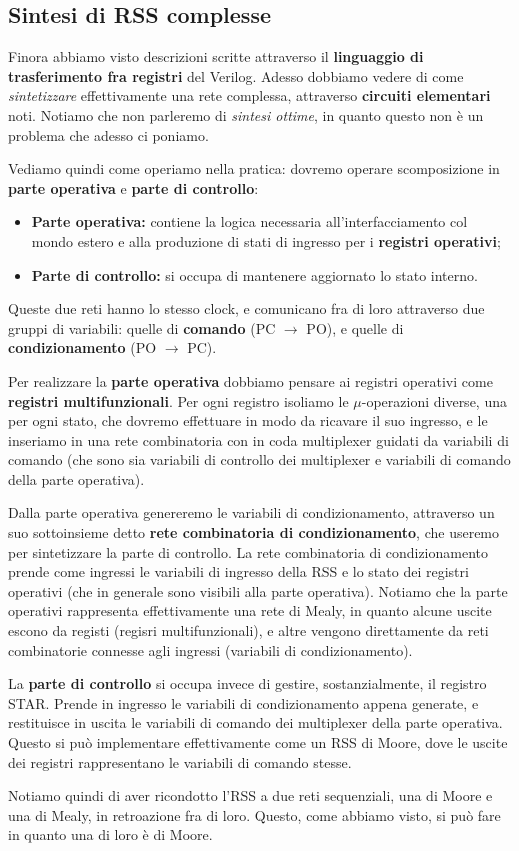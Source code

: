\documentclass[a4paper,11pt]{article}
\begin{document}
\subsection{Sintesi di RSS complesse}
Finora abbiamo visto descrizioni scritte attraverso il \textbf{linguaggio di trasferimento fra registri} del Verilog.
Adesso dobbiamo vedere di come \textit{sintetizzare} effettivamente una rete complessa, attraverso \textbf{circuiti elementari} noti.
Notiamo che non parleremo di \textit{sintesi ottime}, in quanto questo non è un problema che adesso ci poniamo.

Vediamo quindi come operiamo nella pratica: dovremo operare scomposizione in \textbf{parte operativa} e \textbf{parte di controllo}:

\begin{itemize}
	\item \textbf{Parte operativa:} contiene la logica necessaria all'interfacciamento col mondo estero e alla produzione di stati di ingresso per i \textbf{registri operativi};
	\item \textbf{Parte di controllo:} si occupa di mantenere aggiornato lo stato interno.
\end{itemize}
Queste due reti hanno lo stesso clock, e comunicano fra di loro attraverso due gruppi di variabili: quelle di \textbf{comando} (PC $\rightarrow$ PO), e quelle di \textbf{condizionamento} (PO $\rightarrow$ PC).

Per realizzare la \textbf{parte operativa} dobbiamo pensare ai registri operativi come \textbf{registri multifunzionali}.
Per ogni registro isoliamo le $\mu$-operazioni diverse, una per ogni stato, che dovremo effettuare in modo da ricavare il suo ingresso, e le inseriamo in una rete combinatoria con in coda multiplexer guidati da variabili di comando (che sono sia variabili di controllo dei multiplexer e variabili di comando della parte operativa). 

Dalla parte operativa genereremo le variabili di condizionamento, attraverso un suo sottoinsieme detto \textbf{rete combinatoria di condizionamento}, che useremo per sintetizzare la parte di controllo.
La rete combinatoria di condizionamento prende come ingressi le variabili di ingresso della RSS e lo stato dei registri operativi (che in generale sono visibili alla parte operativa).
Notiamo che la parte operativi rappresenta effettivamente una rete di Mealy, in quanto alcune uscite escono da registi (regisri multifunzionali), e altre vengono direttamente da reti combinatorie connesse agli ingressi (variabili di condizionamento).

La \textbf{parte di controllo} si occupa invece di gestire, sostanzialmente, il registro STAR.
Prende in ingresso le variabili di condizionamento appena generate, e restituisce in uscita le variabili di comando dei multiplexer della parte operativa.
Questo si può implementare effettivamente come un RSS di Moore, dove le uscite dei registri rappresentano le variabili di comando stesse.

Notiamo quindi di aver ricondotto l'RSS a due reti sequenziali, una di Moore e una di Mealy, in retroazione fra di loro.
Questo, come abbiamo visto, si può fare in quanto una di loro è di Moore.
\end{document}
